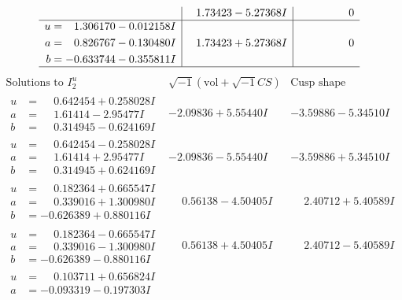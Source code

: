 \documentclass[1p]{elsarticle_modified}
\theoremstyle{definition}
\newcommand{\I}{\sqrt{-1}}
\begin{document}
$$\begin{array}{c|c|c}
 & \phantom{-}1.73423 - 5.27368 I & \phantom{-0.000000 } 0 \\ \hline\begin{aligned}
u &= \phantom{-}1.306170 - 0.012158 I \\
a &= \phantom{-}0.826767 - 0.130480 I \\
b &= -0.633744 - 0.355811 I\end{aligned}
 & \phantom{-}1.73423 + 5.27368 I & \phantom{-0.000000 } 0\\
 \hline 
 \end{array}$$\newpage$$\begin{array}{c|c|c}  
\text{Solutions to }I^u_{2}& \I (\text{vol} + \sqrt{-1}CS) & \text{Cusp shape}\\
 \hline 
\begin{aligned}
u &= \phantom{-}0.642454 + 0.258028 I \\
a &= \phantom{-}1.61414 - 2.95477 I \\
b &= \phantom{-}0.314945 - 0.624169 I\end{aligned}
 & -2.09836 + 5.55440 I & -3.59886 - 5.34510 I \\ \hline\begin{aligned}
u &= \phantom{-}0.642454 - 0.258028 I \\
a &= \phantom{-}1.61414 + 2.95477 I \\
b &= \phantom{-}0.314945 + 0.624169 I\end{aligned}
 & -2.09836 - 5.55440 I & -3.59886 + 5.34510 I \\ \hline\begin{aligned}
u &= \phantom{-}0.182364 + 0.665547 I \\
a &= \phantom{-}0.339016 + 1.300980 I \\
b &= -0.626389 + 0.880116 I\end{aligned}
 & \phantom{-}0.56138 - 4.50405 I & \phantom{-}2.40712 + 5.40589 I \\ \hline\begin{aligned}
u &= \phantom{-}0.182364 - 0.665547 I \\
a &= \phantom{-}0.339016 - 1.300980 I \\
b &= -0.626389 - 0.880116 I\end{aligned}
 & \phantom{-}0.56138 + 4.50405 I & \phantom{-}2.40712 - 5.40589 I \\ \hline\begin{aligned}
u &= \phantom{-}0.103711 + 0.656824 I \\
a &= -0.093319 - 0.197303 I \\

\end{aligned}
\end{array}$$
\end{document}
